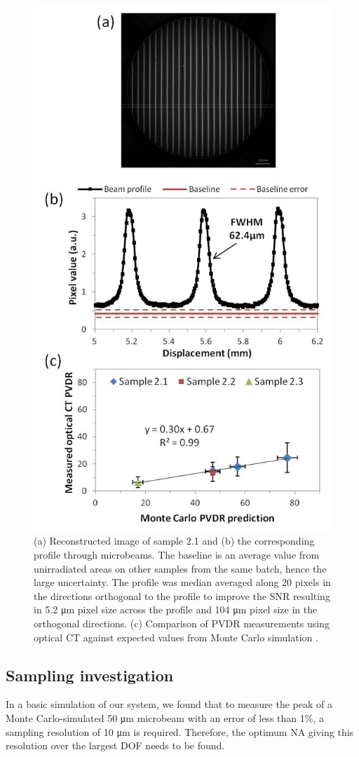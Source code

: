 	\begin{figure}
		\centering
		\includegraphics[width=0.6\linewidth]{mrt_img/mrt_Fig7}
		\caption{(a) Reconstructed image of sample 2.1 and (b) the corresponding profile through microbeams. The baseline is an average value from unirradiated areas on other samples from the same batch, hence the large uncertainty. The profile was median averaged along 20 pixels in the directions orthogonal to the profile to improve the SNR resulting in 5.2 \si{\um} pixel size across the profile and 104 \si{\um} pixel size in the orthogonal directions. (c) Comparison of PVDR measurements using optical CT against expected values from Monte Carlo simulation \cite{martinez-roviradevelopment2012}.}
		\label{fig:Fig7}
	\end{figure}
	
	\subsection{Sampling investigation}
	In a basic simulation of our system, we found that to measure the peak of a Monte Carlo-simulated 50 \si{\um} microbeam with an error of less than 1\%, a sampling resolution of 10 \si{\um} is required. Therefore, the optimum NA giving this resolution over the largest DOF needs to be found.  
		
